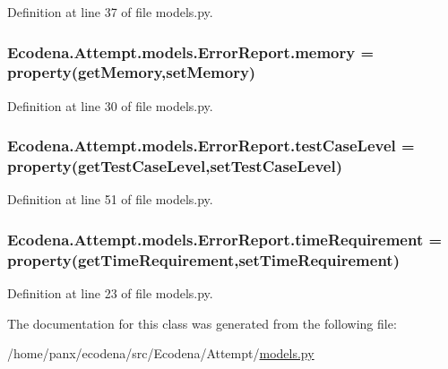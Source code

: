 Definition at line 37 of file models.py.

\hypertarget{class_ecodena_1_1_attempt_1_1models_1_1_error_report_aa8a1d6fab3c2db3efdcc2fe98cb53194}{
\subsubsection[{memory}]{\setlength{\rightskip}{0pt plus 5cm}Ecodena.Attempt.models.ErrorReport.memory = property(getMemory,setMemory)}}
\label{df/d02/class_ecodena_1_1_attempt_1_1models_1_1_error_report_aa8a1d6fab3c2db3efdcc2fe98cb53194}


Definition at line 30 of file models.py.

\hypertarget{class_ecodena_1_1_attempt_1_1models_1_1_error_report_ad9c444fda937b61e579bd7fd78787720}{
\subsubsection[{testCaseLevel}]{\setlength{\rightskip}{0pt plus 5cm}Ecodena.Attempt.models.ErrorReport.testCaseLevel = property(getTestCaseLevel,setTestCaseLevel)}}
\label{df/d02/class_ecodena_1_1_attempt_1_1models_1_1_error_report_ad9c444fda937b61e579bd7fd78787720}


Definition at line 51 of file models.py.

\hypertarget{class_ecodena_1_1_attempt_1_1models_1_1_error_report_a4768d336f6e6359b866809f017e279a0}{
\subsubsection[{timeRequirement}]{\setlength{\rightskip}{0pt plus 5cm}Ecodena.Attempt.models.ErrorReport.timeRequirement = property(getTimeRequirement,setTimeRequirement)}}
\label{df/d02/class_ecodena_1_1_attempt_1_1models_1_1_error_report_a4768d336f6e6359b866809f017e279a0}


Definition at line 23 of file models.py.



The documentation for this class was generated from the following file:\begin{DoxyCompactItemize}
\item 
/home/panx/ecodena/src/Ecodena/Attempt/\hyperlink{_attempt_2models_8py}{models.py}\end{DoxyCompactItemize}
